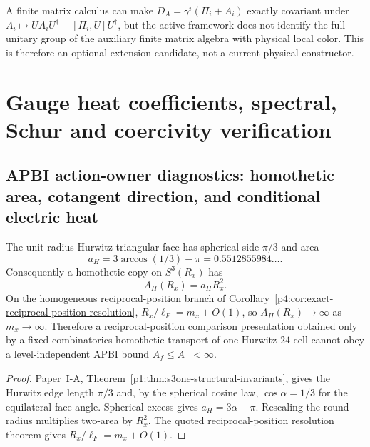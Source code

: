 \documentclass[12pt,a4paper]{article}
\begin{document}
\begin{remark}
\label{p10:rem:v2180-fuzzy-gauge-extension-candidate}
A finite matrix calculus can make
$D_A=\gamma^i(\Pi_i+A_i)$ exactly covariant under
$A_i\mapsto UA_iU^\dagger-[\Pi_i,U]U^\dagger$, but the active framework does
not identify the full unitary group of the auxiliary finite matrix algebra
with physical local color.  This is therefore an optional extension candidate,
not a current physical constructor.
\end{remark}





\section{Gauge heat coefficients, spectral, Schur and coercivity verification}
\label{p13:sec:v237-d2}
\subsection{APBI action-owner diagnostics: homothetic area, cotangent direction, and conditional electric heat}
\label{p10:app:v2159-apbi-action-owner-diagnostics}

\begin{proposition}
\label{p10:prop:v2159-fixed-hurwitz-area-nogo}
The unit-radius Hurwitz triangular face has spherical side $\pi/3$ and area
\[
 a_H=3\arccos(1/3)-\pi=0.5512855984\ldots .
\]
Consequently a homothetic copy on $S^3(R_x)$ has
\[
 A_H(R_x)=a_HR_x^2.
\]
On the homogeneous reciprocal-position branch of
Corollary~\ref{p4:cor:exact-reciprocal-position-resolution},
$R_x/\ell_F=m_x+O(1)$, so $A_H(R_x)\to\infty$ as $m_x\to\infty$.
Therefore a reciprocal-position comparison presentation obtained only by a
fixed-combinatorics homothetic transport of one Hurwitz $24$-cell cannot obey
a level-independent APBI bound $A_f\le A_+<\infty$.
\end{proposition}
\begin{proof}
Paper~I-A, Theorem~\ref{p1:thm:s3one-structural-invariants}, gives the
Hurwitz edge length $\pi/3$ and, by the spherical cosine law,
$\cos\alpha=1/3$ for the equilateral face angle.  Spherical excess gives
$a_H=3\alpha-\pi$.  Rescaling the round radius multiplies two-area by
$R_x^2$.  The quoted reciprocal-position resolution theorem gives
$R_x/\ell_F=m_x+O(1)$.
\end{proof}
\end{document}
